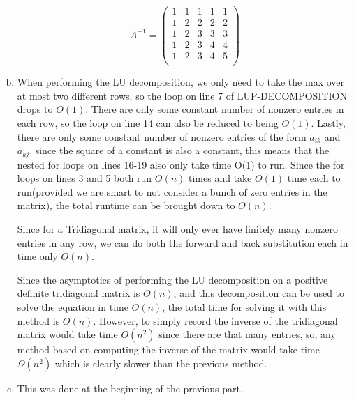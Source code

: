 \documentclass{article}
\begin{document}
\begin{enumerate}[a.]
\[
A^{-1} = \left(\begin{array}{ccccc}
1&1&1&1&1\\
1&2&2&2&2\\
1&2&3&3&3\\
1&2&3&4&4\\
1&2&3&4&5\\
\end{array}\right)
\]
\item
When performing the LU decomposition, we only need to take the max over at most two different rows, so the loop on line 7 of LUP-DECOMPOSITION drops to $O(1)$. There are only some constant number of nonzero entries in each row, so the loop on line 14 can also be reduced to being $O(1)$. Lastly, there are only some constant number of nonzero entries of the form $a_{ik}$ and $a_{kj}$. since the square of a constant is also a constant, this means that the nested for loops on lines 16-19 also only take time O(1) to run. Since the for loops on lines 3 and 5 both run $O(n)$ times and take $O(1)$ time each to run(provided we are smart to not consider a bunch of zero entries in the matrix), the total runtime can be brought down to $O(n)$.

Since for a Tridiagonal matrix, it will only ever have finitely many nonzero entries in any row, we can do both the forward and back substitution each in time only $O(n)$.

Since the asymptotics of performing the LU decomposition on a positive definite tridiagonal matrix is $O(n)$, and this decomposition can be used to solve the equation in time $O(n)$, the total time for solving it with this method is $O(n)$. However, to simply record the inverse of the tridiagonal matrix would take time $O(n^2)$ since there are that many entries, so, any method based on computing the inverse of the matrix would take time $\Omega(n^2)$ which is clearly slower than the previous method.

\item
This was done at the beginning of the previous part.
\end{enumerate}
\end{document}
